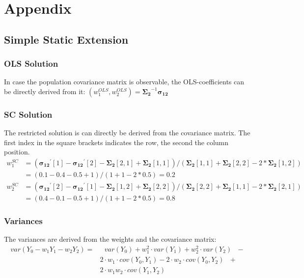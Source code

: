 \section*{Appendix}
\subsection*{Simple Static Extension}
\subsubsection*{OLS Solution}
In case the population covariance matrix is observable, the OLS-coefficients can be directly derived from it: $\left( w_1^{OLS}, w_2^{OLS} \right) = \boldsymbol{\Sigma_2}^{-1} \boldsymbol{\sigma_{12}}  $
\subsubsection*{SC Solution}
The restricted solution is can directly be derived from the covariance matrix. The first index in the square brackets indicates the row, the second the column position. 
\begin{equation*}
	\begin{split}
		w_1^{SC} & = \left( \boldsymbol{\sigma_{12}}^\prime[1] - \boldsymbol{\sigma_{12}}^\prime[2] - \boldsymbol{\Sigma_2}[2,1] + \boldsymbol{\Sigma_2}[1,1] \right) / \left( \boldsymbol{\Sigma_2}[1,1] + \boldsymbol{\Sigma_2}[2,2] - 2 * \boldsymbol{\Sigma_2}[1,2] \right) \\
		& = (0.1-0.4-0.5+1)/(1+1-2*0.5) = 0.2 
	\end{split} 
\end{equation*}
\begin{equation*}
	\begin{split}
		w_2^{SC} & = \left( \boldsymbol{\sigma_{12}}^\prime[2] - \boldsymbol{\sigma_{12}}^\prime[1] - \boldsymbol{\Sigma_2}[1,2] + \boldsymbol{\Sigma_2}[2,2] \right) / \left( \boldsymbol{\Sigma_2}[2,2] + \boldsymbol{\Sigma_2}[1,1] - 2 * \boldsymbol{\Sigma_2}[2,1] \right) \\
		& = (0.4-0.1-0.5+1)/(1+1-2*0.5) = 0.8
	\end{split}
\end{equation*}
\subsubsection*{Variances}
The variances are derived from the weights and the covariance matrix:
\begin{equation*}
	\begin{split}
		var(Y_0 - w_1 Y_1 - w_2 Y_2) = &\text{ }var(Y_0) + w_1^2 \cdot var(Y_1) + w_2^2 \cdot var(Y_2)\text{ }- \\
		& 2 \cdot w_1 \cdot cov(Y_0, Y_1) - 2 \cdot w_2 \cdot cov(Y_0, Y_2)\text{ }+ \\
		&2 \cdot w_1 w_2 \cdot cov(Y_1, Y_2) 
	\end{split}
\end{equation*}